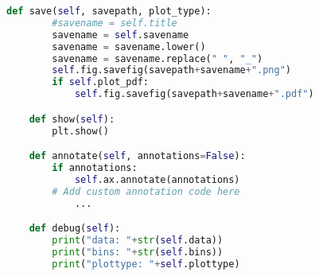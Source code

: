 \begin{lstlisting}[language=Python,caption=myplot.py]
    def save(self, savepath, plot_type):
        #savename = self.title
        savename = self.savename
        savename = savename.lower()
        savename = savename.replace(" ", "_")
        self.fig.savefig(savepath+savename+".png")
        if self.plot_pdf:
            self.fig.savefig(savepath+savename+".pdf")

    def show(self):
        plt.show()

    def annotate(self, annotations=False):
        if annotations:
			self.ax.annotate(annotations)
		# Add custom annotation code here
			...

    def debug(self):
        print("data: "+str(self.data))
        print("bins: "+str(self.bins))
        print("plottype: "+self.plottype)

\end{lstlisting}